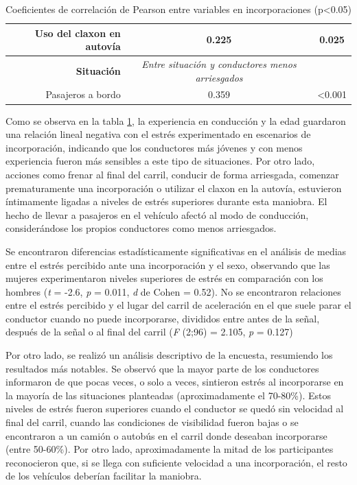 \begin{table}[h]
{\begin{tabular}{rcc}
    Uso del   claxon en autovía                                                          & 0.225                                                                                                                                     & 0.025            \\ \hline
    \textbf{Situación}                                                                   & \textit{Entre situación y conductores menos arriesgados}                                                                                  &                  \\ \hline
    Pasajeros a bordo                                                                    & 0.359                                                                                                                                     & \textless{}0.001 \\ \hline
    \end{tabular}%
    }
    \caption{Coeficientes de correlación de Pearson entre variables en incorporaciones (p<0.05)}
    \label{tab:3.1}
\end{table}

Como se observa en la tabla \ref{tab:3.1}, la experiencia en conducción y la edad guardaron una relación lineal negativa con el estrés experimentado en escenarios de incorporación, indicando que los conductores más jóvenes y con menos experiencia fueron más sensibles a este tipo de situaciones. Por otro lado, acciones como frenar al final del carril, conducir de forma arriesgada, comenzar prematuramente una incorporación o utilizar el claxon en la autovía, estuvieron íntimamente ligadas a niveles de estrés superiores durante esta maniobra. El hecho de llevar a pasajeros en el vehículo afectó al modo de conducción, considerándose los propios conductores como menos arriesgados. 

Se encontraron diferencias estadísticamente significativas en el análisis de medias entre el estrés percibido ante una incorporación y el sexo, observando que las mujeres experimentaron niveles superiores de estrés en comparación con los hombres (\emph{t} = -2.6, \emph{p} = 0.011, \emph{d} de Cohen = 0.52). No se encontraron relaciones entre el estrés percibido y el lugar del carril de aceleración en el que suele parar el conductor cuando no puede incorporarse, divididos entre antes de la señal, después de la señal o al final del carril (\emph{F} (2;96) = 2.105, \emph{p} = 0.127) 

Por otro lado, se realizó un análisis descriptivo de la encuesta, resumiendo los resultados más notables. Se observó que la mayor parte de los conductores informaron de que pocas veces, o solo a veces, sintieron estrés al incorporarse en la mayoría de las situaciones planteadas (aproximadamente el 70-80\%). Estos niveles de estrés fueron superiores cuando el conductor se quedó sin velocidad al final del carril, cuando las condiciones de visibilidad fueron bajas o se encontraron a un camión o autobús en el carril donde deseaban incorporarse (entre 50-60\%). Por otro lado, aproximadamente la mitad de los participantes reconocieron que, si se llega con suficiente velocidad a una incorporación, el resto de los vehículos deberían facilitar la maniobra.  

